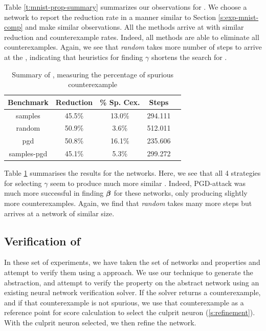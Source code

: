 Table \ref{t:mnist-prop-summary} summarizes our observations for \mnist. We
choose a network to report the reduction rate in a manner similar to Section
\ref{s:exp-mnist-comp} and make similar observations. All the methods arrive at
\abs with similar reduction and counterexample rates. Indeed, 
all methods are able to eliminate all
counterexamples. Again, we see that \textit{random} takes more number of steps
to arrive at the \abs, indicating that heuristics for finding $\gamma$ shortens
the search for \abs.

\begin{table}
\begin{tabular}{|c|c|c|c|c|}
\hline
Benchmark   & Reduction  & \% Sp. Cex. & Steps    \\
\hline
samples     & 45.5\%     &  13.0\%     & 294.111  \\
random      & 50.9\%     &  3.6\%      & 512.011  \\
pgd         & 50.8\%     &  16.1\%     & 235.606  \\
samples-pgd & 45.1\%     &  5.3\%      & 299.272  \\
\hline
\end{tabular}
\caption{Summary of \acasxu, measuring the percentage of spurious counterexample }
\label{t:acas-ncex}
\end{table}

Table \ref{t:acas-ncex} summarises the results for the \acasxu networks. Here,
we see that all 4 strategies for selecting $\gamma$ seem to produce much more
similar \abs. Indeed, PGD-attack was much more successful in finding
$\boldsymbol{\beta}$ for these networks, only producing slightly more counterexamples.
Again, we find that \textit{random} takes many more steps but arrives at a
network of similar size.

\subsection{Verification of \acasxu}

In these set of experiments, we have taken the \acasxu set of
networks and properties and attempt to verify them using a \cegar approach. We
use our technique to generate the abstraction, and attempt to verify the
property on the abstract network using an existing neural network verification
solver. If the solver returns a counterexample, and if that counterexample is
not spurious, we use that counterexample as a reference point for score
calculation  to select the culprit neuron (\ref{s:refinement}). With the culprit
neuron selected, we then refine the network.

